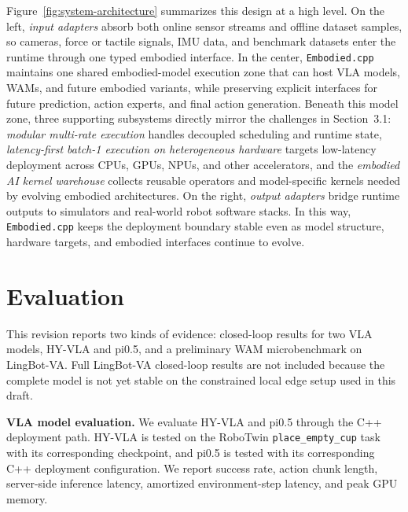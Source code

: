 \documentclass[11pt,letterpaper,logo]{seu-paisys}
\newcommand{\system}{\texttt{Embodied.cpp}\xspace}
\begin{document}
Figure~\ref{fig:system-architecture} summarizes this design at a high level. On the left, \emph{input adapters} absorb both online sensor streams and offline dataset samples, so cameras, force or tactile signals, IMU data, and benchmark datasets enter the runtime through one typed embodied interface. In the center, \system maintains one shared embodied-model execution zone that can host VLA models, WAMs, and future embodied variants, while preserving explicit interfaces for future prediction, action experts, and final action generation. Beneath this model zone, three supporting subsystems directly mirror the challenges in Section~3.1: \emph{modular multi-rate execution} handles decoupled scheduling and runtime state, \emph{latency-first batch-1 execution on heterogeneous hardware} targets low-latency deployment across CPUs, GPUs, NPUs, and other accelerators, and the \emph{embodied AI kernel warehouse} collects reusable operators and model-specific kernels needed by evolving embodied architectures. On the right, \emph{output adapters} bridge runtime outputs to simulators and real-world robot software stacks. In this way, \system keeps the deployment boundary stable even as model structure, hardware targets, and embodied interfaces continue to evolve.

\section{Evaluation}

This revision reports two kinds of evidence: closed-loop results for two VLA models, HY-VLA and pi0.5, and a preliminary WAM microbenchmark on LingBot-VA. Full LingBot-VA closed-loop results are not included because the complete model is not yet stable on the constrained local edge setup used in this draft.

\noindent\textbf{VLA model evaluation.} We evaluate HY-VLA and pi0.5 through the C++ deployment path. HY-VLA is tested on the RoboTwin \texttt{place\_empty\_cup} task with its corresponding checkpoint, and pi0.5 is tested with its corresponding C++ deployment configuration. We report success rate, action chunk length, server-side inference latency, amortized environment-step latency, and peak GPU memory.
\end{document}
